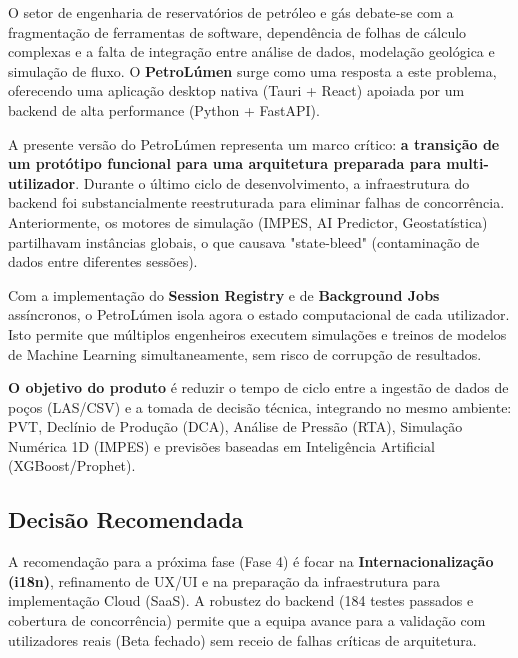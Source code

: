 \documentclass[12pt,a4paper]{article}
\begin{document}
O setor de engenharia de reservatórios de petróleo e gás debate-se com a fragmentação de ferramentas de software, dependência de folhas de cálculo complexas e a falta de integração entre análise de dados, modelação geológica e simulação de fluxo. O \textbf{PetroLúmen} surge como uma resposta a este problema, oferecendo uma aplicação desktop nativa (Tauri + React) apoiada por um backend de alta performance (Python + FastAPI).

A presente versão do PetroLúmen representa um marco crítico: \textbf{a transição de um protótipo funcional para uma arquitetura preparada para multi-utilizador}. Durante o último ciclo de desenvolvimento, a infraestrutura do backend foi substancialmente reestruturada para eliminar falhas de concorrência. Anteriormente, os motores de simulação (IMPES, AI Predictor, Geostatística) partilhavam instâncias globais, o que causava "state-bleed" (contaminação de dados entre diferentes sessões). 

Com a implementação do \textbf{Session Registry} e de \textbf{Background Jobs} assíncronos, o PetroLúmen isola agora o estado computacional de cada utilizador. Isto permite que múltiplos engenheiros executem simulações e treinos de modelos de Machine Learning simultaneamente, sem risco de corrupção de resultados.

\textbf{O objetivo do produto} é reduzir o tempo de ciclo entre a ingestão de dados de poços (LAS/CSV) e a tomada de decisão técnica, integrando no mesmo ambiente: PVT, Declínio de Produção (DCA), Análise de Pressão (RTA), Simulação Numérica 1D (IMPES) e previsões baseadas em Inteligência Artificial (XGBoost/Prophet).

\subsection*{Decisão Recomendada}

A recomendação para a próxima fase (Fase 4) é focar na \textbf{Internacionalização (i18n)}, refinamento de UX/UI e na preparação da infraestrutura para implementação Cloud (SaaS). A robustez do backend (184 testes passados e cobertura de concorrência) permite que a equipa avance para a validação com utilizadores reais (Beta fechado) sem receio de falhas críticas de arquitetura.
\end{document}
